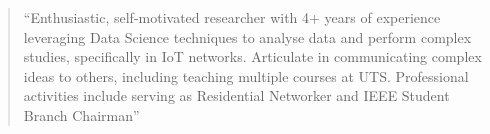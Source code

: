 \begin{quote}






``Enthusiastic, self-motivated researcher with 4+ years of experience leveraging Data Science techniques to analyse data and perform complex studies, specifically in IoT networks. Articulate in communicating complex ideas to others, including teaching multiple courses at UTS. Professional activities include serving as Residential Networker and IEEE Student Branch Chairman''
\end{quote}


\divider





